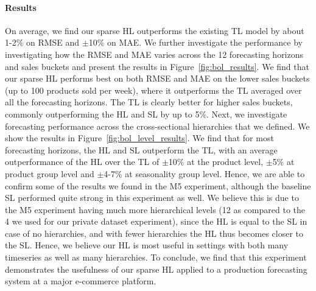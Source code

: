 \documentclass[preprint, 3p, times, twocolumn]{elsarticle}
\begin{document}
  \paragraph{Results} On average, we find our sparse HL outperforms the existing TL model by about 1-2\% on RMSE and \(\pm\)10\% on MAE. We further investigate the performance by investigating how the RMSE and MAE varies across the 12 forecasting horizons and sales buckets and present the results in Figure~\ref{fig:bol_results}. We find that our sparse HL performs best on both RMSE and MAE on the lower sales buckets (up to 100 products sold per week), where it outperforms the TL averaged over all the forecasting horizons. The TL is clearly better for higher sales buckets, commonly outperforming the HL and SL by up to 5\%. Next, we investigate forecasting performance across the cross-sectional hierarchies that we defined. We show the results in Figure~\ref{fig:bol_level_results}. We find that for most forecasting horizons, the HL and SL outperform the TL, with an average outperformance of the HL over the TL of \(\pm\)10\% at the  product level, \(\pm\)5\% at product group level and \(\pm\)4-7\% at seasonality group level. Hence, we are able to confirm some of the results we found in the M5 experiment, although the baseline SL performed quite strong in this experiment as well. We believe this is due to the M5 experiment having much more hierarchical levels (12 as compared to the 4 we used for our private dataset experiment), since the HL is equal to the SL in case of no hierarchies, and with fewer hierarchies the HL thus becomes closer to the SL. Hence, we believe our HL is most useful in settings with both many timeseries as well as many hierarchies.
  To conclude, we find that this experiment demonstrates the usefulness of our sparse HL applied to a production forecasting system at a major e-commerce platform.
\end{document}
